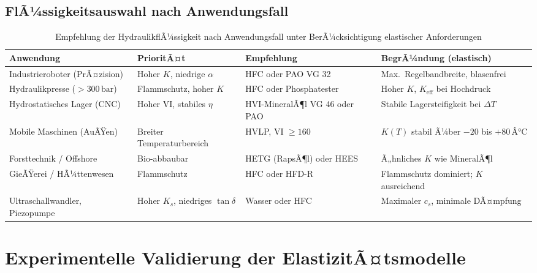 ﻿\documentclass[a4paper,12pt]{scrreprt}
\theoremstyle{definition}
\begin{document}
\subsection{FlÃ¼ssigkeitsauswahl nach Anwendungsfall}

\begin{table}[H]
  \centering
  \caption{Empfehlung der HydraulikflÃ¼ssigkeit nach Anwendungsfall
    unter BerÃ¼cksichtigung elastischer Anforderungen}
  \label{tab:fluid_auswahl}
  \begin{tabular}{p{3.5cm}p{2.5cm}p{3.0cm}p{3.5cm}}
    \toprule
    \textbf{Anwendung}
      & \textbf{PrioritÃ¤t}
      & \textbf{Empfehlung}
      & \textbf{BegrÃ¼ndung (elastisch)} \\
    \midrule
    Industrieroboter (PrÃ¤zision)
      & Hoher $K$, niedrige $\alpha$
      & HFC oder PAO VG 32
      & Max.\ Regelbandbreite, blasenfrei \\[4pt]
    Hydraulikpresse ($> 300\,\mathrm{bar}$)
      & Flammschutz, hoher $K$
      & HFC oder Phosphatester
      & Hoher $K$, $K_{\mathrm{eff}}$ bei Hochdruck \\[4pt]
    Hydrostatisches Lager (CNC)
      & Hoher VI, stabiles $\eta$
      & HVI-MineralÃ¶l VG 46 oder PAO
      & Stabile Lagersteifigkeit bei $\Delta T$ \\[4pt]
    Mobile Maschinen (AuÃŸen)
      & Breiter Temperaturbereich
      & HVLP, VI $\geq 160$
      & $K(T)$ stabil Ã¼ber $-20$ bis $+80\,Â°\mathrm{C}$ \\[4pt]
    Forsttechnik / Offshore
      & Bio-abbaubar
      & HETG (RapsÃ¶l) oder HEES
      & Ã„hnliches $K$ wie MineralÃ¶l \\[4pt]
    GieÃŸerei / HÃ¼ttenwesen
      & Flammschutz
      & HFC oder HFD-R
      & Flammschutz dominiert; $K$ ausreichend \\[4pt]
    Ultraschallwandler, Piezopumpe
      & Hoher $K_s$, niedriges $\tan\delta$
      & Wasser oder HFC
      & Maximaler $c_s$, minimale DÃ¤mpfung \\
    \bottomrule
  \end{tabular}
\end{table}

\section{Experimentelle Validierung der ElastizitÃ¤tsmodelle}
\label{sec:experimente}
\end{document}

